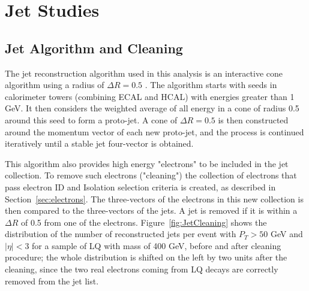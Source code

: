 %
\section{Jet Studies} \label{sec:jet}

\subsection{Jet Algorithm and Cleaning}

The jet reconstruction algorithm used in this analysis is an interactive cone algorithm using a radius of $\Delta R=0.5$ \cite{JetAlg}.  
The algorithm starts with seeds in calorimeter towers (combining ECAL and HCAL) with energies greater than 
1 GeV. It then considers the weighted average of all energy in a cone of radius 0.5 around this seed to form a proto-jet.  
A cone of $\Delta R = 0.5$ is then constructed around the momentum vector of each new proto-jet,  
and the process is continued iteratively until a stable jet four-vector is obtained.


This algorithm also provides high energy "electrons" to be included in the jet collection. 
To remove such electrons ("cleaning") the collection of electrons that pass electron ID and Isolation 
selection criteria is created, as described in Section~\ref{sec:electrons}. The three-vectors of the 
electrons in this new collection is then compared to the three-vectors of the jets. 
A jet is removed if it is within a $\Delta R$ of 0.5 from one of the electrons. 
Figure~\ref{fig:JetCleaning} shows the distribution of the number of reconstructed jets 
per event with $P_{T}>50$ GeV and $|\eta|<3$ for a sample of LQ with mass of 400 GeV, before and after cleaning procedure; 
the whole distribution is shifted on the left by two units after the cleaning, since the two real electrons 
coming from LQ decays are correctly removed from the jet list. 

